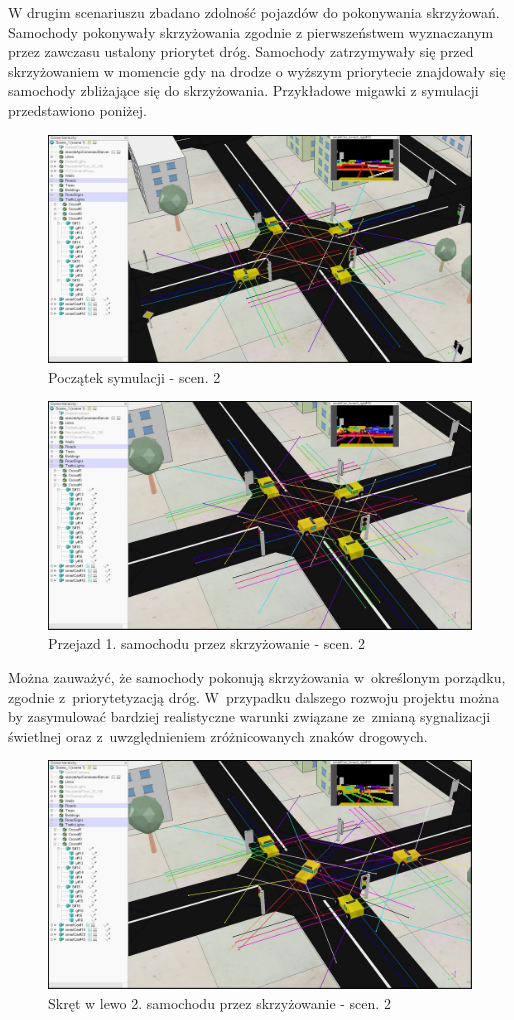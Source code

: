 W drugim scenariuszu zbadano zdolność pojazdów do pokonywania skrzyżowań. Samochody pokonywały skrzyżowania zgodnie z pierwszeństwem wyznaczanym przez zawczasu ustalony priorytet dróg. Samochody zatrzymywały się przed skrzyżowaniem w momencie gdy na drodze o wyższym priorytecie znajdowały się samochody zbliżające się do skrzyżowania. Przykładowe migawki z symulacji przedstawiono poniżej.

\begin{figure}[H]
	\centering
	\centering
	\includegraphics[width=.8\linewidth]{p21.jpg}
	\caption{Początek symulacji - scen. 2}
	\label{fig:p21}
\end{figure}

\begin{figure}[H]
	\centering
	\centering
	\includegraphics[width=.8\linewidth]{p22.jpg}
	\caption{Przejazd 1. samochodu przez skrzyżowanie - scen. 2}
	\label{fig:p22}
\end{figure}

Można zauważyć, że samochody pokonują skrzyżowania w~określonym porządku, zgodnie z~priorytetyzacją dróg. W~przypadku dalszego rozwoju projektu można by zasymulować bardziej realistyczne warunki związane ze~zmianą sygnalizacji świetlnej oraz z~uwzględnieniem zróżnicowanych znaków drogowych. 

\begin{figure}[H]
	\centering
	\centering
	\includegraphics[width=.8\linewidth]{p23.jpg}
	\caption{Skręt w lewo 2. samochodu przez skrzyżowanie - scen. 2}
	\label{fig:p23}
\end{figure}

